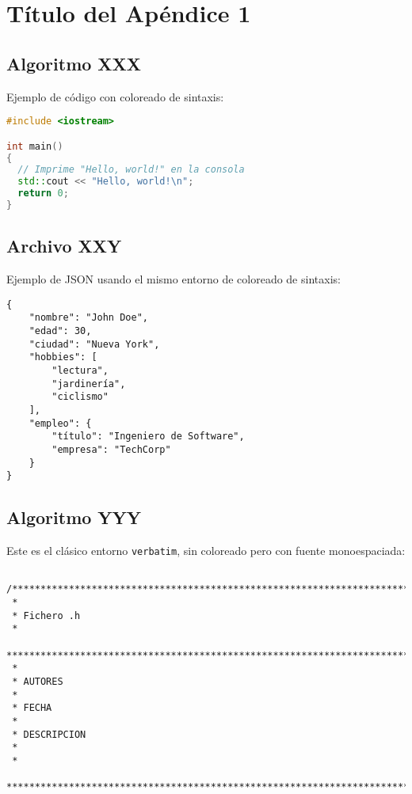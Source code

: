 \chapter{Título del Apéndice 1}
\label{ch:apéndice-uno}

\section{Algoritmo XXX}
\label{sec:algoritmo-xxx}

Ejemplo de código con coloreado de sintaxis:

\begin{lstlisting}[language=C++]
#include <iostream>

int main()
{
  // Imprime "Hello, world!" en la consola
  std::cout << "Hello, world!\n";
  return 0;
}
\end{lstlisting}

\section{Archivo XXY}
\label{sec:archivo-xxy}

Ejemplo de JSON usando el mismo entorno de coloreado de sintaxis:

\begin{lstlisting}
{
    "nombre": "John Doe",
    "edad": 30,
    "ciudad": "Nueva York",
    "hobbies": [
        "lectura",
        "jardinería",
        "ciclismo"
    ],
    "empleo": {
        "título": "Ingeniero de Software",
        "empresa": "TechCorp"
    }
}
\end{lstlisting}
 
\section{Algoritmo YYY}
\label{sec:algoritmo-yyy}

Este es el clásico entorno \texttt{verbatim}, sin coloreado pero con fuente monoespaciada:

\begin{center}
\begin{footnotesize}
\begin{verbatim}

/***********************************************************************************
 *
 * Fichero .h
 *
 ***********************************************************************************
 *
 * AUTORES
 *
 * FECHA
 *
 * DESCRIPCION
 *
 *
 ************************************************************************************/
 
\end{verbatim}
\end{footnotesize}
\end{center}

